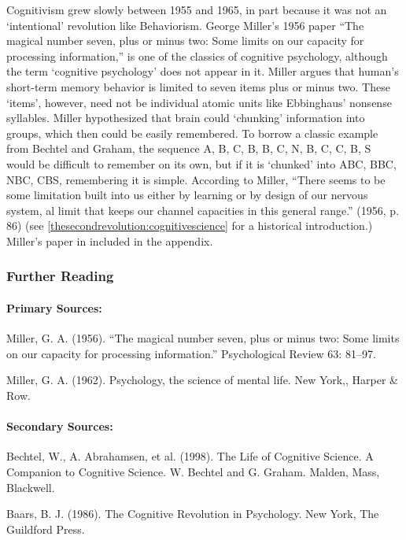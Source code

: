 Cognitivism grew slowly between 1955 and 1965, in part because it was not an `intentional' revolution like Behaviorism. George Miller's 1956 paper ``The magical number seven, plus or minus two: Some limits on our capacity for processing information,'' is one of the classics of cognitive psychology, although the term `cognitive psychology' does not appear in it. Miller argues that human's short-term memory behavior is limited to seven items plus or minus two. These `items', however, need not be individual atomic units like Ebbinghaus' nonsense syllables. Miller hypothesized that brain could `chunking' information into groups, which then could be easily remembered. To borrow a classic example from Bechtel and Graham, the sequence A, B, C, B, B, C, N, B, C, C, B, S would be difficult to remember on its own, but if it is `chunked' into ABC, BBC, NBC, CBS, remembering it is simple. According to Miller, ``There seems to be some limitation built into us either by learning or by design of our nervous system, al limit that keeps our channel capacities in this general range.'' (1956, p. 86) (see \ref{thesecondrevolution:cognitivescience} for a historical introduction.) Miller's paper in included in the appendix.

\subsubsection{Further Reading}
\label{furtherreading}

\paragraph{Primary Sources:}
\label{primarysources:}

Miller, G. A. (1956). ``The magical number seven, plus or minus two: Some limits on our capacity for processing information.'' Psychological Review 63: 81--97.

Miller, G. A. (1962). Psychology, the science of mental life. New York,, Harper \& Row.

\paragraph{Secondary Sources:}
\label{secondarysources:}

Bechtel, W., A. Abrahamsen, et al. (1998). The Life of Cognitive Science. A Companion to Cognitive Science. W. Bechtel and G. Graham. Malden, Mass, Blackwell.

Baars, B. J. (1986). The Cognitive Revolution in Psychology. New York, The Guildford Press.

